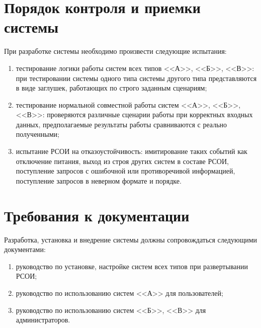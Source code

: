 \section{Порядок контроля и приемки системы}
При разработке системы необходимо произвести следующие испытания:
\begin{enumerate}
	\item тестирование логики работы систем всех типов <<А>>, <<Б>>, <<В>>: при тестировании системы одного типа системы другого типа представляются в виде заглушек, работающих по строго заданным сценариям;
	\item тестирование нормальной совместной работы систем <<А>>, <<Б>>, <<В>>: проверяются различные сценарии работы при корректных входных данных, предполагаемые результаты работы сравниваются с реально полученными;
	\item испытание РСОИ на отказоустойчивость: имитирование таких событий как отключение питания, выход из строя других систем в составе РСОИ, поступление запросов с ошибочной или противоречивой информацией, поступление запросов в неверном формате и порядке.
\end{enumerate}


\section{Требования к документации}
Разработка, установка и внедрение системы должны сопровождаться следующими документами:

\begin{enumerate}
	\item руководство по установке, настройке систем всех типов при развертывании РСОИ;
	\item руководство по использованию систем <<А>> для пользователей;
	\item руководство по использованию систем <<Б>>, <<В>> для администраторов.
\end{enumerate}



